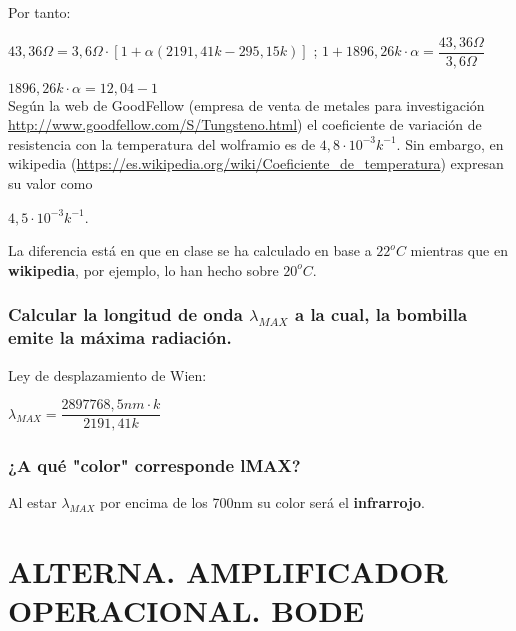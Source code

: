 Por tanto:
\vspace{10pt}

$ 43,36 \Omega = 3,6 \Omega \cdot [ 1 + \alpha (2191,41k - 295,15k)] $ \hspace{6pt} ; $ 1 + 1896,26k \cdot \alpha = \dfrac{43,36 \Omega}{3,6\Omega} $
\vspace{10pt}

$ 1896,26k \cdot \alpha = 12,04 - 1 $ \hspace{4pt} \fboxrule=1pt \fboxsep=6pt\\

Según la web de GoodFellow (empresa de venta de metales para investigación \url{http://www.goodfellow.com/S/Tungsteno.html}) el coeficiente de variación de resistencia con la temperatura del wolframio es de \textbf{$ 4,8 \cdot10^{-3}k^{-1} $}. Sin embargo, en wikipedia (\url{https://es.wikipedia.org/wiki/Coeficiente_de_temperatura}) expresan su valor como 

\textbf{$ 4,5\cdot10^{-3}k^{-1} $}.

La diferencia está en que en clase se ha calculado en base a $ 22^{o}C $ mientras que en \textbf{wikipedia}, por ejemplo, lo han hecho sobre $ 20^{o}C $.

\subsubsection{Calcular la longitud de onda $ \lambda_{MAX} $ a la cual, la bombilla emite la máxima radiación.}

Ley de desplazamiento de Wien: \fboxrule=1pt \fboxsep=6pt\\
\vspace{6pt}

$ \lambda_{MAX} = \dfrac{2897768,5 nm\cdot k}{2191,41 k} $ \hspace{4pt} \fboxrule=1pt \fboxsep=6pt

\subsubsection{¿A qué "color" corresponde lMAX?}

Al estar $ \lambda_{MAX} $ por encima de los 700nm su color será el \textbf{infrarrojo}.

\newpage


\section{ALTERNA. AMPLIFICADOR OPERACIONAL. BODE}

